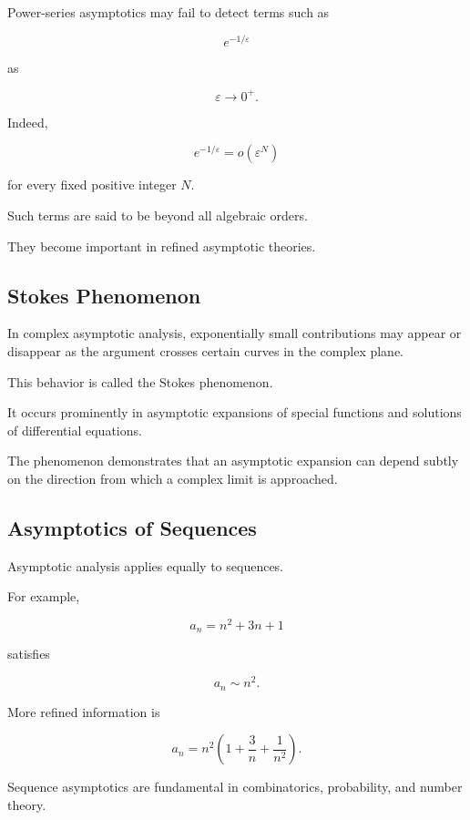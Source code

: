 Power-series asymptotics may fail to detect terms such as

\[
\boxed{
e^{-1/\varepsilon}
}
\]

as

\[
\varepsilon\to0^+.
\]

Indeed,

\[
\boxed{
e^{-1/\varepsilon}
=
o(\varepsilon^N)
}
\]

for every fixed positive integer \(N\).

Such terms are said to be beyond all algebraic orders.

They become important in refined asymptotic theories.

\subsection{Stokes Phenomenon}
\label{subsec:stokes-phenomenon}

In complex asymptotic analysis, exponentially small contributions may
appear or disappear as the argument crosses certain curves in the complex
plane.

This behavior is called the Stokes phenomenon.

It occurs prominently in asymptotic expansions of special functions and
solutions of differential equations.

The phenomenon demonstrates that an asymptotic expansion can depend
subtly on the direction from which a complex limit is approached.

\subsection{Asymptotics of Sequences}
\label{subsec:asymptotics-of-sequences}

Asymptotic analysis applies equally to sequences.

For example,

\[
a_n
=
n^2+3n+1
\]

satisfies

\[
\boxed{
a_n\sim n^2.
}
\]

More refined information is

\[
\boxed{
a_n
=
n^2
\left(
1+\frac3n+\frac1{n^2}
\right).
}
\]

Sequence asymptotics are fundamental in combinatorics, probability, and
number theory.

